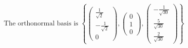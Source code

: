 \documentclass[a3paper,12pt]{extarticle} %
\begin{document}
\begin{enumerate}
\begin{enumerate}
\[            \text{The orthonormal basis is } \left\{ \begin{pmatrix} \frac{1}{\sqrt{2}} \\ -\frac{1}{\sqrt{2}} \\ 0 \end{pmatrix}, \begin{pmatrix} 0 \\ 1 \\ 0 \end{pmatrix}, \begin{pmatrix} -\frac{1}{\sqrt{30}} \\ \frac{5}{\sqrt{30}} \\ \frac{2}{\sqrt{30}} \end{pmatrix} \right\}
        \]
    \end{enumerate}
\end{enumerate}
\end{document}
